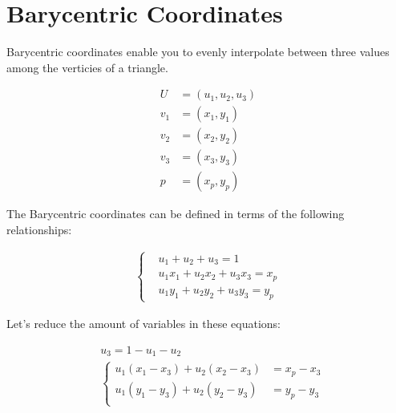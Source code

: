 \documentclass{article}
\begin{document}
\section{Barycentric Coordinates}

Barycentric coordinates enable you to evenly interpolate between three values among the verticies of a triangle.

\def\xa{0} \def\ya{0}
\def\xb{1} \def\yb{2}
\def\xc{3} \def\yc{-1}
\def\xp{1} \def\yp{0.25}
\begin{center}
\end{center}

\begin{align}
  U &= (u_1, u_2, u_3) \\
  v_1 &= (x_1, y_1) \\
  v_2 &= (x_2, y_2) \\
  v_3 &= (x_3, y_3) \\
  p   &= (x_p, y_p)
\end{align}

The Barycentric coordinates can be defined in terms of the following relationships:

\begin{align}
  \begin{cases}
  & u_1 + u_2 + u_3 = 1 \\
  & u_1x_1 + u_2x_2 + u_3x_3 = x_p \\
  & u_1y_1 + u_2y_2 + u_3y_3 = y_p
  \end{cases}
\end{align}


Let's reduce the amount of variables in these equations:

\begin{align}
  & u_3 = 1 - u_1 - u_2 \\
  & \begin{cases}
    u_1(x_1 - x_3) + u_2(x_2 - x_3) &= x_p - x_3 \\
    u_1(y_1 - y_3) + u_2(y_2 - y_3) &= y_p - y_3 \\
  \end{cases}
\end{align}
\end{document}
